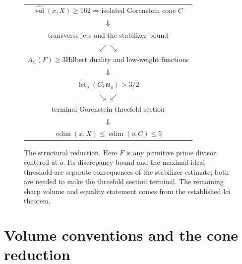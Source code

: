 \documentclass[11pt]{article}
\theoremstyle{definition}
\theoremstyle{remark}
\numberwithin{equation}{section}
\newcommand{\m}{\mathfrak m}
\newcommand{\nvol}{\widehat{\operatorname{vol}}}
\newcommand{\edim}{\operatorname{edim}}
\newcommand{\lct}{\operatorname{lct}}
\begin{document}
\begin{figure}[tb]
\centering
\renewcommand{\arraystretch}{1.35}
\begin{tabular}{c}
\(\nvol(x,X)\ge162\)\quad\(\Longrightarrow\)\quad isolated Gorenstein cone \(C\)\\
\(\Downarrow\)\\
transverse jets and the stabilizer bound\\
\(\swarrow\)\hspace{65mm}\(\searrow\)\\
\(A_C(F)\ge3\)\hspace{15mm}Hilbert duality and low-weight functions\\
\hspace{63mm}\(\Downarrow\)\\
\hspace{56mm}\(\lct_o(C;\m_o)>3/2\)\\
\(\searrow\)\hspace{65mm}\(\swarrow\)\\
terminal Gorenstein threefold section\\
\(\Downarrow\)\\
\(\edim(x,X)\le\edim(o,C)\le5\)
\end{tabular}
\caption{The structural reduction. Here \(F\) is any primitive prime divisor centered at \(o\). Its discrepancy bound and the maximal-ideal threshold are separate consequences of the stabilizer estimate; both are needed to make the threefold section terminal. The remaining sharp volume and equality statement comes from the established lci theorem.}
\label{fig:proof-route}
\end{figure}

\section{Volume conventions and the cone reduction}\label{sec:reduction}
\end{document}
